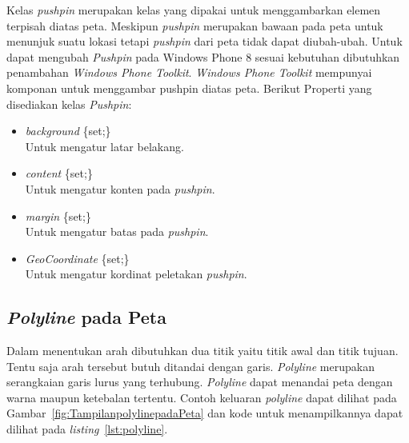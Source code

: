 \hspace{0.5cm} Kelas \textit{pushpin} merupakan kelas yang dipakai untuk menggambarkan elemen terpisah diatas peta. Meskipun \textit{pushpin} merupakan bawaan pada peta untuk menunjuk suatu lokasi tetapi \textit{pushpin} dari peta tidak dapat diubah-ubah. Untuk dapat mengubah \textit{Pushpin} pada Windows Phone 8 sesuai kebutuhan dibutuhkan penambahan \textit{Windows Phone Toolkit}. \textit{Windows Phone Toolkit} mempunyai komponan untuk menggambar pushpin diatas peta.  
Berikut Properti yang disediakan kelas \textit{Pushpin}:
\begin{itemize}
	\item \textit{background} \{set;\} \\
	Untuk mengatur latar belakang.
	\item \textit{content} \{set;\} \\
	Untuk mengatur konten pada \textit{pushpin}.
	\item \textit{margin} \{set;\} \\
	Untuk mengatur batas pada \textit{pushpin}.
	\item \textit{GeoCoordinate} \{set;\} \\
	Untuk mengatur kordinat peletakan \textit{pushpin}.
\end{itemize}

\subsection{\textit{Polyline} pada Peta \cite{MSDN}}
\label{subsubsec:Polyline pada Peta}
\hspace{0.5cm} Dalam menentukan arah dibutuhkan dua titik yaitu titik awal dan titik tujuan. Tentu saja arah tersebut butuh ditandai dengan garis. \textit{Polyline} merupakan serangkaian garis lurus yang terhubung. \textit{Polyline} dapat menandai peta dengan warna maupun ketebalan tertentu. Contoh keluaran \textit{polyline} dapat dilihat pada Gambar~\ref{fig:TampilanpolylinepadaPeta} dan kode untuk menampilkannya dapat dilihat pada \textit{listing}~\ref{lst:polyline}.

